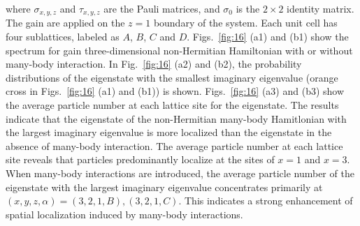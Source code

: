 \documentclass[longbibliography, aps, prx, amsmath, amssymb, amsfonts, twocolumn,superscriptaddress, footinbib]{revtex4-1}
\begin{document}
	where $\sigma_{x,y,z}$ and $\tau_{x,y,z}$ are the Pauli matrices, and $\sigma_0$ is the $2\times 2$ identity matrix. The gain are applied on the $z=1$ boundary of the system. Each unit cell has four sublattices, labeled as $A$, $B$, $C$ and $D$. 
	Figs.~\ref{fig:16} (a1) and (b1) show the spectrum for gain three-dimensional non-Hermitian Hamiltonian with or without many-body interaction. 
	In Fig.~\ref{fig:16} (a2) and (b2), the probability distributions of the eigenstate with the smallest imaginary eigenvalue (orange cross in Figs.~\ref{fig:16} (a1) and (b1)) is shown.
	 Figs.~\ref{fig:16} (a3) and (b3) show the average particle number at each lattice site for the eigenstate.
	The results indicate that the eigenstate of the non-Hermitian many-body Hamitlonian with the largest imaginary eigenvalue is more localized than the eigenstate in the absence of many-body interaction.
	The average particle number at each lattice site reveals that particles predominantly localize at the sites of $x=1$ and $x=3$.
	When many-body interactions are introduced, the average particle number of the eigenstate with the largest imaginary eigenvalue concentrates primarily at $(x,y,z,\alpha)=(3,2,1,B),(3,2,1,C)$. This indicates a strong enhancement of spatial localization induced by many-body interactions. 
\end{document}
